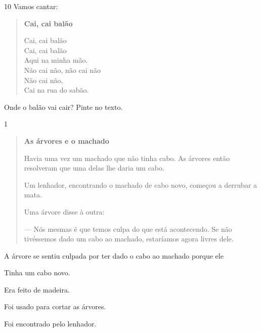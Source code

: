 
\num{10} Vamos cantar:

\begin{verse}
\textbf{Cai, cai balão}

Cai, cai balão\\
Cai, cai balão\\
Aqui na minha mão.\\
Não cai não, não cai não\\
Não cai não,\\
Cai na rua do sabão.
\end{verse}


Onde o balão vai cair? Pinte no texto.


\num{1}

\begin{quote}
\textbf{As árvores e o machado}

Havia uma vez um machado que não tinha cabo.
As árvores então resolveram que uma delas lhe daria
um cabo.

Um lenhador, encontrando o machado de cabo novo,
começou a derrubar a mata.

Uma árvore disse à outra:

--- Nós mesmas é que temos culpa do que está
acontecendo. Se não tivéssemos dado um cabo ao machado,
estaríamos agora livres dele.
\end{quote}


A árvore se sentiu culpada por ter dado o cabo ao machado porque ele

\begin{escolha}
\item Tinha um cabo novo.

\item Era feito de madeira.

\item Foi usado para cortar as árvores.

\item Foi encontrado pelo lenhador.
\end{escolha}


